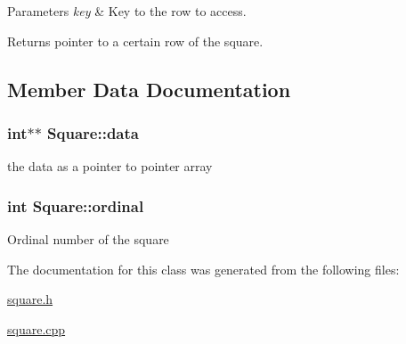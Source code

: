 \begin{DoxyParams}{Parameters}
{\em key} & Key to the row to access.\\
\hline
\end{DoxyParams}
\begin{DoxyReturn}{Returns}
pointer to a certain row of the square. 
\end{DoxyReturn}


\subsection{Member Data Documentation}
\hypertarget{classSquare_a3b5a8a3e9ae6e0570dd54ab360bacef0}{
\subsubsection[{data}]{\setlength{\rightskip}{0pt plus 5cm}int$\ast$$\ast$ Square\-::data\hspace{0.3cm}{\ttfamily [protected]}}}\label{classSquare_a3b5a8a3e9ae6e0570dd54ab360bacef0}
the data as a pointer to pointer array \hypertarget{classSquare_abfaf02c2958d841dc7def09197d26d93}{
\subsubsection[{ordinal}]{\setlength{\rightskip}{0pt plus 5cm}int Square\-::ordinal\hspace{0.3cm}{\ttfamily [protected]}}}\label{classSquare_abfaf02c2958d841dc7def09197d26d93}
Ordinal number of the square 

The documentation for this class was generated from the following files\-:\begin{DoxyCompactItemize}
\item 
\hyperlink{square_8h}{square.\-h}\item 
\hyperlink{square_8cpp}{square.\-cpp}\end{DoxyCompactItemize}
